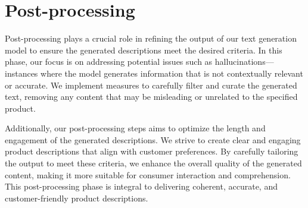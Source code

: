 \begin{center}
	\par
\end{center}

\section{Post-processing}

Post-processing plays a crucial role in refining the output of our text generation model to ensure the generated descriptions meet the desired criteria. In this phase, our focus is on addressing potential issues such as hallucinations—instances where the model generates information that is not contextually relevant or accurate. We implement measures to carefully filter and curate the generated text, removing any content that may be misleading or unrelated to the specified product.

Additionally, our post-processing steps aims to optimize the length and engagement of the generated descriptions. We strive to create clear and engaging product descriptions that align with customer preferences. By carefully tailoring the output to meet these criteria, we enhance the overall quality of the generated content, making it more suitable for consumer interaction and comprehension. This post-processing phase is integral to delivering coherent, accurate, and customer-friendly product descriptions.


